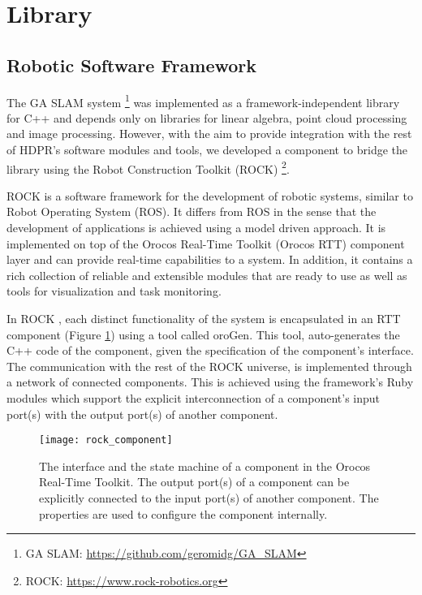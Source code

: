 \section{Library}

\subsection{Robotic Software Framework}

The GA SLAM system \footnote{GA SLAM: \url{https://github.com/geromidg/GA_SLAM}}
was implemented as a framework-independent library for C++ and depends only
on libraries for linear algebra, point cloud processing and image processing.
However, with the aim to provide integration with the rest of HDPR's
software modules and tools, we developed a component to bridge
the library using the Robot Construction Toolkit (ROCK)
\footnote{ROCK: \url{https://www.rock-robotics.org}}.

ROCK is a software framework for the development of robotic systems,
similar to Robot Operating System (ROS).
It differs from ROS in the sense that the development of applications
is achieved using a model driven approach.
It is implemented on top of the Orocos Real-Time Toolkit (Orocos RTT)
component layer and can provide real-time capabilities to a system.
In addition, it contains a rich collection of reliable and extensible
modules that are ready to use as well as tools for visualization and
task monitoring.

In ROCK \parencite{Joyeux2011}, each distinct functionality of the system is
encapsulated in an RTT component (Figure \ref{fig:rock_component}) using a
tool called oroGen.
This tool, auto-generates the C++ code of the component, given
the specification of the component's interface.
The communication with the rest of the ROCK universe, is implemented through
a network of connected components.
This is achieved using the framework's Ruby modules which support the explicit
interconnection of a component's input port(s) with the output port(s)
of another component.

\begin{figure}[h!]
    \centering
    \texttt{[image: rock\_component]}
    \decoRule
    \caption[ROCK component interface]{
        The interface and the state machine of a component in the Orocos
        Real-Time Toolkit. The output port(s) of a component can be explicitly
        connected to the input port(s) of another component. The properties
        are used to configure the component internally.
    }
    \label{fig:rock_component}
\end{figure}

